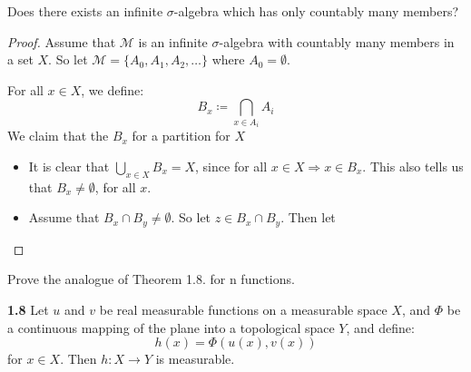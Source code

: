 


    \begin{exercise}
        Does there exists an infinite $\sigma$-algebra which has only countably many members?
    \begin{proof}
        Assume that $\mathcal{M}$ is an infinite $\sigma$-algebra with countably many members in a set $X$. So let $\mathcal{M} = \{A_0,A_1,A_2,\ldots\}$ where $A_0 = \emptyset$.

        For all $x\in X$, we define:\[
            B_x \coloneqq \bigcap_{x\in A_i} A_i
        \] 
        We claim that the $B_x$ for a partition for $X$\begin{itemize}
            \item It is clear that $\bigcup_{x\in X} B_x = X$, since for all $x\in X\Rightarrow x\in B_x$. This also tells us that $B_x \neq \emptyset$, for all $x$.
            \item Assume that $B_x\cap B_y\neq \emptyset$. So let $z\in B_x\cap B_y$. Then let 
        \end{itemize}
    \end{proof}
    \end{exercise}

    \begin{exercise}
        Prove the analogue of Theorem 1.8. for n functions.
        
        \begin{theorem}\textbf{1.8}
            Let $u$ and $v$ be real measurable functions on a measurable space $X$, and $\Phi$ be a continuous mapping of the plane into a topological space $Y$, and define:\begin{equation*}
                h(x) = \Phi(u(x),v(x))
            \end{equation*}
            for $x\in X$. Then $h\colon X\rightarrow Y$ is measurable.
        \end{theorem}
    \end{exercise}


